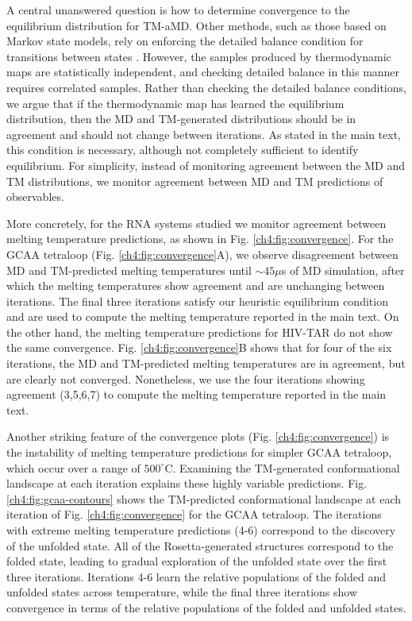 A central unanswered question is how to determine convergence to the equilibrium distribution for TM-aMD. Other methods, such as those based on Markov state models, rely on enforcing the detailed balance condition for transitions between states \cite{msm}. However, the samples produced by thermodynamic maps are statistically independent, and checking detailed balance in this manner requires correlated samples. Rather than checking the detailed balance conditions, we argue that if the thermodynamic map has learned the equilibrium distribution, then the MD and TM-generated distributions should be in agreement and should not change between iterations. As stated in the main text, this condition is necessary, although not completely sufficient to identify equilibrium. For simplicity, instead of monitoring agreement between the MD and TM distributions, we monitor agreement between MD and TM predictions of observables.

More concretely, for the RNA systems studied we monitor agreement between melting temperature predictions, as shown in Fig. \ref{ch4:fig:convergence}. For the GCAA tetraloop (Fig. \ref{ch4:fig:convergence}A), we observe disagreement between MD and TM-predicted melting temperatures until $\sim45\mu$s of MD simulation, after which the melting temperatures show agreement and are unchanging between iterations. The final three iterations satisfy our heuristic equilibrium condition and are used to compute the melting temperature reported in the main text. On the other hand, the melting temperature predictions for HIV-TAR do not show the same convergence. Fig. \ref{ch4:fig:convergence}B shows that for four of the six iterations, the MD and TM-predicted melting temperatures are in agreement, but are clearly not converged. Nonetheless, we use the four iterations showing agreement (3,5,6,7) to compute the melting temperature reported in the main text.

Another striking feature of the convergence plots (Fig. \ref{ch4:fig:convergence}) is the instability of melting temperature predictions for simpler GCAA tetraloop, which occur over a range of $500^\circ$C. Examining the TM-generated conformational landscape at each iteration explains these highly variable predictions. Fig. \ref{ch4:fig:gcaa-contours} shows the TM-predicted conformational landscape at each iteration of Fig. \ref{ch4:fig:convergence} for the GCAA tetraloop. The iterations with extreme melting temperature predictions (4-6) correspond to the discovery of the unfolded state. All of the Rosetta-generated structures correspond to the folded state, leading to gradual exploration of the unfolded state over the first three iterations. Iterations 4-6 learn the relative populations of the folded and unfolded states across temperature, while the final three iterations show convergence in terms of the relative populations of the folded and unfolded states.

